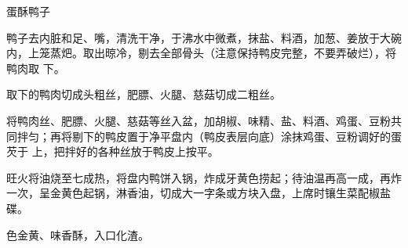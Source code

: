 %
%
%
%
%
%
%
\begin{recipe}{蛋酥鸭子}

\ingredients


\preparation

\step 鸭子去内脏和足、嘴，清洗干净，于沸水中微煮，抹盐、料酒，加葱、姜放于大碗
内，上笼蒸𤆵。取出晾冷，剔去全部骨头（注意保持鸭皮完整，不要弄破烂），将鸭肉取
下。

\step 取下的鸭肉切成头粗丝，肥膘、火腿、慈菇切成二粗丝。

\step 将鸭肉丝、肥膘、火腿、慈菇等丝入盆，加胡椒、味精、盐、料酒、鸡蛋、豆粉共
同拌匀；再将剔下的鸭皮置于净平盘内（鸭皮表层向底）涂抹鸡蛋、豆粉调好的蛋芡于
上，把拌好的各种丝放于鸭皮上按平。

\step 旺火将油烧至七成热，将盘内鸭饼入锅，炸成牙黄色捞起；待油温再高一成，再炸
一次，呈金黄色起锅，淋香油，切成大一字条或方块入盘，上席时镶生菜配椒盐碟。

\features

色金黄、味香酥，入口化渣。

\end{recipe}

